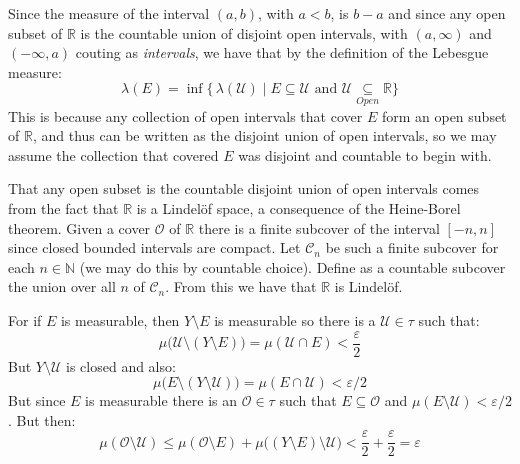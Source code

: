 \documentclass[crop=false,class=article]{standalone}                           %
\begin{document}
        \begin{solution}
            Since the measure of the interval $(a,b)$, with $a<b$, is $b-a$ and
            since any open subset of $\mathbb{R}$ is the countable union of
            disjoint open intervals, with $(a,\infty)$ and $(\minus\infty,a)$
            couting as \textit{intervals}, we have that by the definition of the
            Lebesgue measure:
            \begin{equation}
                \lambda(E)=
                \inf\big\{\,\lambda(\mathcal{U})\;|\;E\subseteq\mathcal{U}
                    \textrm{ and }\mathcal{U}\underset{Open}{\subseteq}
                    \mathbb{R}\big\}
            \end{equation}
            This is because any collection of open intervals that cover $E$
            form an open subset of $\mathbb{R}$, and thus can be written as the
            disjoint union of open intervals, so we may assume the collection
            that covered $E$ was disjoint and countable to begin with.
            \par\hfill\par
            That any open subset is the countable disjoint union of open
            intervals comes from the fact that $\mathbb{R}$ is a Lindel\"{o}f
            space, a consequence of the Heine-Borel theorem. Given a cover
            $\mathcal{O}$ of $\mathbb{R}$ there is a finite subcover of the
            interval $[\minus{n},n]$ since closed bounded intervals are compact.
            Let $\mathcal{C}_{n}$ be such a finite subcover for each
            $n\in\mathbb{N}$ (we may do this by countable choice). Define as a
            countable subcover the union over all $n$ of $\mathcal{C}_{n}$. From
            this we have that $\mathbb{R}$ is Lindel\"{o}f.
            \par\hfill\par
            For if $E$ is measurable, then $Y\setminus{E}$ is measurable so
            there is a $\mathcal{U}\in\tau$ such that:
            \begin{equation}
                \mu\big(\mathcal{U}\setminus(Y\setminus{E})\big)
                =\mu(\mathcal{U}\cap{E})<\frac{\varepsilon}{2}
            \end{equation}
            But ${Y}\setminus\mathcal{U}$ is closed and also:
            \begin{equation}
                \mu\big(E\setminus(Y\setminus\mathcal{U})\big)
                =\mu(E\cap\mathcal{U})<\varepsilon/2
            \end{equation}
            But since $E$ is measurable there is an $\mathcal{O}\in\tau$ such
            that $E\subseteq\mathcal{O}$ and
            $\mu(E\setminus\mathcal{U})<\varepsilon/2$. But then:
            \begin{equation}
                \mu(\mathcal{O}\setminus\mathcal{U})
                \leq\mu(\mathcal{O}\setminus{E})
                +\mu\big((Y\setminus{E})\setminus\mathcal{U}\big)
                <\frac{\varepsilon}{2}+\frac{\varepsilon}{2}
                =\varepsilon
            \end{equation}
        \end{solution}
\end{document}
